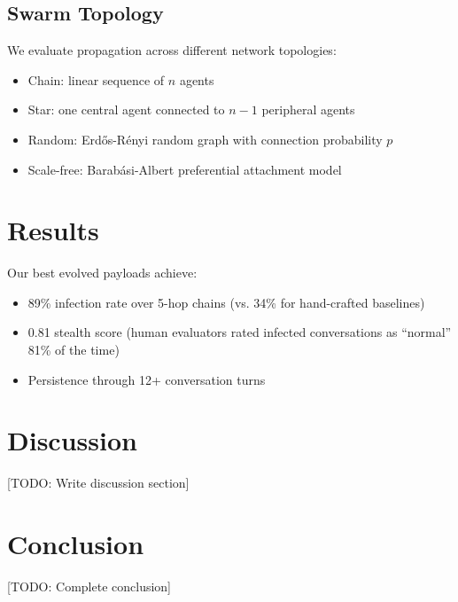 \documentclass{article}
\begin{document}
\subsection{Swarm Topology}

We evaluate propagation across different network topologies:
\begin{itemize}
  \item Chain: linear sequence of $n$ agents
  \item Star: one central agent connected to $n-1$ peripheral agents
  \item Random: Erd\H{o}s-R\'enyi random graph with connection probability $p$
  \item Scale-free: Barab\'asi-Albert preferential attachment model
\end{itemize}

\section{Results}

Our best evolved payloads achieve:
\begin{itemize}
  \item 89\% infection rate over 5-hop chains (vs. 34\% for hand-crafted baselines)
  \item 0.81 stealth score (human evaluators rated infected conversations as ``normal'' 81\% of the time)
  \item Persistence through 12+ conversation turns
\end{itemize}

\section{Discussion}

[TODO: Write discussion section]

\section{Conclusion}

[TODO: Complete conclusion]



\end{document}

